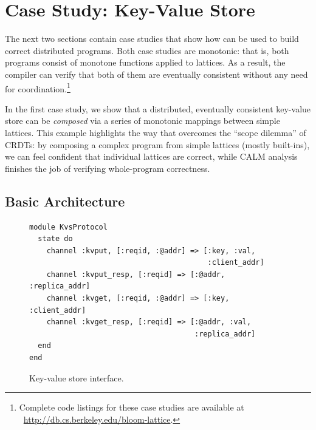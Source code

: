 \section{Case Study: Key-Value Store}
\label{sec:kvs}
The next two sections contain case studies that show how \lang can be used to
build correct distributed programs. Both case studies are monotonic: that is,
both programs consist of monotone functions applied to lattices. As a result,
the \lang compiler can verify that both of them are eventually consistent
without any need for coordination.\footnote{Complete code listings for these case
  studies are available at \mbox{\small
    \url{http://db.cs.berkeley.edu/bloom-lattice}}.}

In the first case study, we show that a distributed, eventually consistent
key-value store can be \emph{composed} via a series of monotonic mappings
between simple lattices. This example highlights the way that \lang overcomes
the ``scope dilemma'' of CRDTs: by composing a complex program from simple
lattices (mostly \lang built-ins), we can feel confident that individual
lattices are correct, while CALM analysis finishes the job of verifying
whole-program correctness.




\subsection{Basic Architecture}
\begin{figure}[t]
\begin{scriptsize}
\begin{lstlisting}
module KvsProtocol
  state do
    channel :kvput, [:reqid, :@addr] => [:key, :val,
                                         :client_addr]
    channel :kvput_resp, [:reqid] => [:@addr, :replica_addr]
    channel :kvget, [:reqid, :@addr] => [:key, :client_addr]
    channel :kvget_resp, [:reqid] => [:@addr, :val,
                                      :replica_addr]
  end
end
\end{lstlisting}
\end{scriptsize}
\caption{Key-value store interface.}
\label{fig:kvs-interface}
\end{figure}

